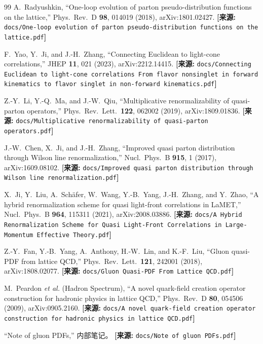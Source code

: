 \documentclass[12pt,a4paper]{ctexart}
\theoremstyle{definition}
\begin{document}
\begin{thebibliography}{99}
A.~Radyushkin,
``One-loop evolution of parton pseudo-distribution functions on the lattice,''
Phys.\ Rev.\ D \textbf{98}, 014019 (2018), arXiv:1801.02427.
\quad\textbf{[来源:} \texttt{docs/One-loop evolution of parton pseudo-distribution functions on the lattice.pdf}\textbf{]}

F.~Yao, Y.~Ji, and J.-H.~Zhang,
``Connecting Euclidean to light-cone correlations,''
JHEP \textbf{11}, 021 (2023), arXiv:2212.14415.
\quad\textbf{[来源:} \texttt{docs/Connecting Euclidean to light-cone correlations From flavor nonsinglet in forward kinematics to flavor singlet in non-forward kinematics.pdf}\textbf{]}

Z.-Y.~Li, Y.-Q.~Ma, and J.-W.~Qiu,
``Multiplicative renormalizability of quasi-parton operators,''
Phys.\ Rev.\ Lett.\ \textbf{122}, 062002 (2019), arXiv:1809.01836.
\quad\textbf{[来源:} \texttt{docs/Multiplicative renormalizability of quasi-parton operators.pdf}\textbf{]}

J.-W.~Chen, X.~Ji, and J.-H.~Zhang,
``Improved quasi parton distribution through Wilson line renormalization,''
Nucl.\ Phys.\ B \textbf{915}, 1 (2017), arXiv:1609.08102.
\quad\textbf{[来源:} \texttt{docs/Improved quasi parton distribution through Wilson line renormalization.pdf}\textbf{]}

X.~Ji, Y.~Liu, A.~Sch\"afer, W.~Wang, Y.-B.~Yang, J.-H.~Zhang, and Y.~Zhao,
``A hybrid renormalization scheme for quasi light-front correlations in LaMET,''
Nucl.\ Phys.\ B \textbf{964}, 115311 (2021), arXiv:2008.03886.
\quad\textbf{[来源:} \texttt{docs/A Hybrid Renormalization Scheme for Quasi Light-Front Correlations in Large-Momentum Effective Theory.pdf}\textbf{]}

Z.-Y.~Fan, Y.-B.~Yang, A.~Anthony, H.-W.~Lin, and K.-F.~Liu,
``Gluon quasi-PDF from lattice QCD,''
Phys.\ Rev.\ Lett.\ \textbf{121}, 242001 (2018), arXiv:1808.02077.
\quad\textbf{[来源:} \texttt{docs/Gluon Quasi-PDF From Lattice QCD.pdf}\textbf{]}

M.~Peardon \textit{et al.} (Hadron Spectrum),
``A novel quark-field creation operator construction for hadronic physics in lattice QCD,''
Phys.\ Rev.\ D \textbf{80}, 054506 (2009), arXiv:0905.2160.
\quad\textbf{[来源:} \texttt{docs/A novel quark-field creation operator construction for hadronic physics in lattice QCD.pdf}\textbf{]}

``Note of gluon PDFs,'' 内部笔记。
\quad\textbf{[来源:} \texttt{docs/Note of gluon PDFs.pdf}\textbf{]}

\end{thebibliography}
\end{document}
